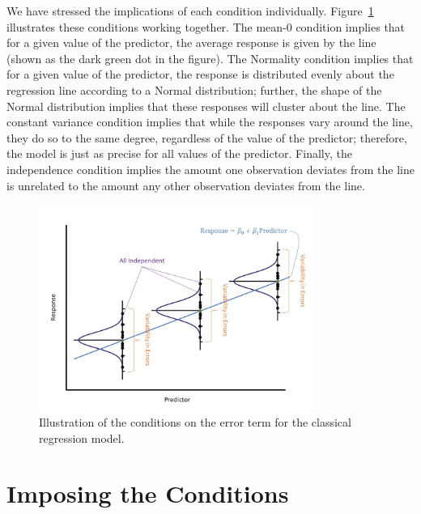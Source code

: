 \documentclass[
  letterpaper,
  DIV=11,
  numbers=noendperiod]{scrreprt}
\theoremstyle{definition}
\theoremstyle{definition}
\theoremstyle{plain}
\theoremstyle{remark}
\begin{document}
We have stressed the implications of each condition individually.
Figure~\ref{fig-regconditions-assumptions} illustrates these conditions
working together. The mean-0 condition implies that for a given value of
the predictor, the average response is given by the line (shown as the
dark green dot in the figure). The Normality condition implies that for
a given value of the predictor, the response is distributed evenly about
the regression line according to a Normal distribution; further, the
shape of the Normal distribution implies that these responses will
cluster about the line. The constant variance condition implies that
while the responses vary around the line, they do so to the same degree,
regardless of the value of the predictor; therefore, the model is just
as precise for all values of the predictor. Finally, the independence
condition implies the amount one observation deviates from the line is
unrelated to the amount any other observation deviates from the line.

\begin{figure}

{\centering \includegraphics[width=0.8\textwidth,height=\textheight]{./images/RegConditions-Assumptions.jpg}

}

\caption{\label{fig-regconditions-assumptions}Illustration of the
conditions on the error term for the classical regression model.}

\end{figure}

\hypertarget{imposing-the-conditions}{%
\section{Imposing the Conditions}\label{imposing-the-conditions}}
\end{document}
